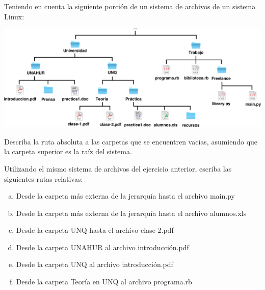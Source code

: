 \begin{exercise}
Teniendo en cuenta la siguiente porción de un sistema de archivos de un
sistema Linux:

\centerline{\includegraphics[scale=0.4]{capitulos/informatica/imagenes/directorios_relativos.png}}

Describa la ruta absoluta a las carpetas que se encuentren vacías, asumiendo que la
carpeta superior es la raíz del sistema.
\end{exercise}

\begin{exercise}
Utilizando el mismo sistema de archivos del ejercicio anterior, escriba
las siguientes rutas relativas:
\begin{enumerate}[a)]
    \item Desde la carpeta más externa de la jerarquía hasta el archivo
        main.py
    \item Desde la carpeta más externa de la jerarquía hasta el archivo
        alumnos.xls
    \item Desde la carpeta UNQ hasta el archivo clase-2.pdf
    \item Desde la carpeta UNAHUR al archivo introducción.pdf
    \item Desde la carpeta UNQ al archivo introducción.pdf
    \item Desde la carpeta Teoría en UNQ al archivo programa.rb
\end{enumerate}
\end{exercise}


